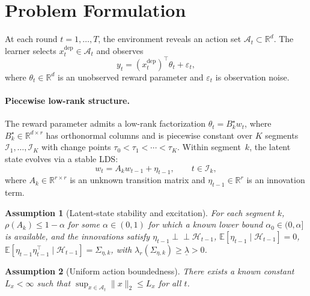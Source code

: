 \documentclass{article}
\newcommand{\R}{\mathbb{R}}
\newcommand{\E}{\mathbb{E}}
\newcommand{\cA}{\mathcal{A}}
\newcommand{\cH}{\mathcal{H}}
\newcommand{\cI}{\mathcal{I}}
\newtheorem{assumption}{Assumption}
\begin{document}
\section{Problem Formulation}
\label{sec:formulation}

At each round $t = 1, \ldots, T$, the environment reveals an action set $\cA_t \subset \R^d$.
The learner selects $x_t^{\mathrm{dep}} \in \cA_t$ and observes
\begin{equation}
  y_t = (x_t^{\mathrm{dep}})^\top \theta_t + \varepsilon_t,
  \label{eq:reward}
\end{equation}
where $\theta_t \in \R^d$ is an unobserved reward parameter and $\varepsilon_t$ is observation noise.

\paragraph{Piecewise low-rank structure.}
The reward parameter admits a low-rank factorization $\theta_t = B_k^\star w_t$, where $B_k^\star \in \R^{d \times r}$ has orthonormal columns and is piecewise constant over $K$ segments $\cI_1, \ldots, \cI_K$ with change points $\tau_0 < \tau_1 < \cdots < \tau_K$.
Within segment~$k$, the latent state evolves via a stable LDS:
\begin{equation}
  w_t = A_k w_{t-1} + \eta_{t-1}, \qquad t \in \cI_k,
  \label{eq:lds}
\end{equation}
where $A_k \in \R^{r \times r}$ is an unknown transition matrix and $\eta_{t-1} \in \R^r$ is an innovation term.

\begin{assumption}[Latent-state stability and excitation]
\label{assum:latent_dynamics}
For each segment $k$,
$\rho(A_k)\le 1-\alpha$ for some $\alpha\in(0,1)$ for which a known lower bound $\alpha_0\in(0,\alpha]$ is available,
and the innovations satisfy
$\eta_{t-1}\perp\!\!\!\perp \cH_{t-1}$,
$\E[\eta_{t-1}\mid \cH_{t-1}] = 0$,
$\E[\eta_{t-1}\eta_{t-1}^\top \mid \cH_{t-1}] = \Sigma_{\eta,k}$,
with $\lambda_r(\Sigma_{\eta,k}) \ge \underline{\lambda} > 0$.
\end{assumption}

\begin{assumption}[Uniform action boundedness]
\label{assum:action_boundedness}
There exists a known constant $L_x<\infty$ such that
$\sup_{x\in\cA_t}\|x\|_2 \le L_x$ for all $t$.
\end{assumption}
\end{document}
